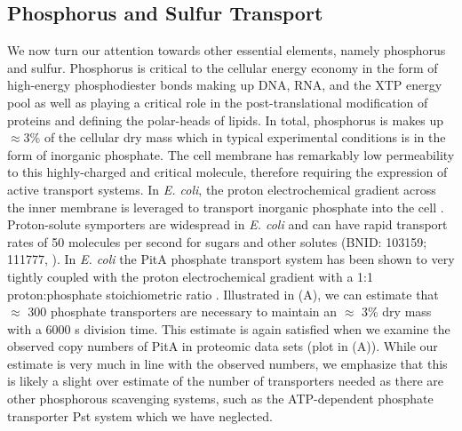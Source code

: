 \subsection{Phosphorus and Sulfur Transport}
We now turn our attention towards other essential elements, namely phosphorus and
sulfur. Phosphorus is critical to the cellular energy economy in the form of
high-energy phosphodiester bonds making up DNA, RNA, and the XTP energy pool as
well as playing a critical role in the post-translational modification of
proteins and defining the polar-heads of lipids. In total, phosphorus is
makes up $\approx$3\% of the cellular dry mass which in typical experimental conditions is in the form of inorganic phosphate. The cell membrane
has remarkably low permeability to this highly-charged and critical molecule,
therefore requiring the expression of active transport systems. In \textit{E. coli}, the proton
electrochemical gradient across the inner membrane is leveraged to transport
inorganic phosphate into the cell \cite{rosenberg1977}.
Proton-solute symporters are widespread in \textit{E. coli} \cite{ramos1977,
booth1979} and can have rapid transport rates of 50 molecules per second for 
sugars and other solutes (BNID: 103159; 111777, \cite{milo2010}). In \textit{E.
coli} the PitA phosphate transport system has been shown to very tightly coupled
with the proton electrochemical gradient with a 1:1 proton:phosphate
stoichiometric ratio \citep{harris2001, feist2007}. Illustrated in
(A), we can estimate that $\approx$ 300
phosphate transporters are necessary to maintain an $\approx$ 3\% dry mass with
a 6000 s division time. This estimate is again satisfied when we examine the
observed copy numbers of PitA in proteomic data sets (plot in
(A)). While our estimate is very much in line with the
observed numbers, we emphasize that this is likely a slight over estimate of the
number of transporters needed as there are other phosphorous scavenging systems,
such as the ATP-dependent phosphate transporter Pst system which we have neglected. 

